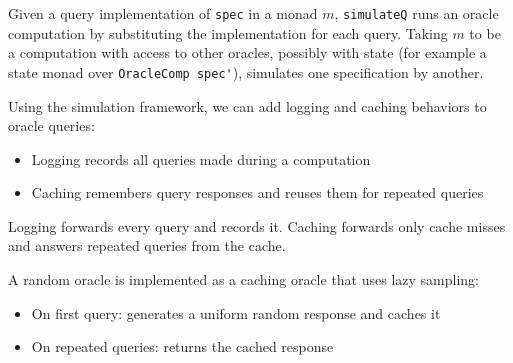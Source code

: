 \begin{definition}
    \label{def:sim_oracle}
    Given a query implementation of \verb|spec| in a monad $m$, \verb|simulateQ| runs an oracle
    computation by substituting the implementation for each query. Taking $m$ to be a computation
    with access to other oracles, possibly with state (for example a state monad over \verb|OracleComp spec'|),
    simulates one specification by another.
    \leanok
\end{definition}

\begin{definition}
    \label{def:logging_caching_oracle_queries}
    Using the simulation framework, we can add logging and caching behaviors to oracle queries:
    \begin{itemize}
        \item Logging records all queries made during a computation
        \item Caching remembers query responses and reuses them for repeated queries
    \end{itemize}
    Logging forwards every query and records it. Caching forwards only cache misses and answers
    repeated queries from the cache.
    \leanok
\end{definition}

\begin{definition}
    \label{def:random_oracle}
    A random oracle is implemented as a caching oracle that uses lazy sampling:
    \begin{itemize}
        \item On first query: generates a uniform random response and caches it
        \item On repeated queries: returns the cached response
    \end{itemize}
    \leanok
\end{definition}
